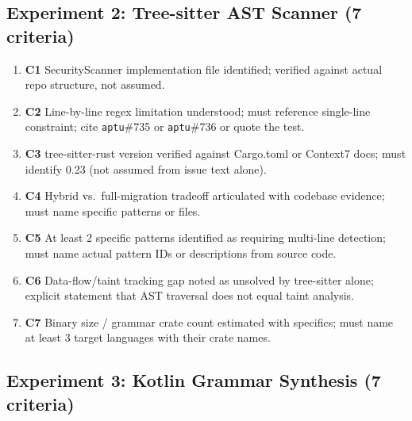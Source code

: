 \documentclass[11pt,a4paper]{article}
\begin{document}
\subsection*{Experiment 2: Tree-sitter AST Scanner (7 criteria)}

\begin{enumerate}
  \item \textbf{C1} SecurityScanner implementation file identified; verified against actual
        repo structure, not assumed.
  \item \textbf{C2} Line-by-line regex limitation understood; must reference single-line
        constraint; cite \texttt{aptu}\#735 or \texttt{aptu}\#736 or quote the test.
  \item \textbf{C3} tree-sitter-rust version verified against Cargo.toml or Context7 docs;
        must identify 0.23 (not assumed from issue text alone).
  \item \textbf{C4} Hybrid vs.\ full-migration tradeoff articulated with codebase evidence;
        must name specific patterns or files.
  \item \textbf{C5} At least 2 specific patterns identified as requiring multi-line detection;
        must name actual pattern IDs or descriptions from source code.
  \item \textbf{C6} Data-flow/taint tracking gap noted as unsolved by tree-sitter alone;
        explicit statement that AST traversal does not equal taint analysis.
  \item \textbf{C7} Binary size / grammar crate count estimated with specifics; must name at
        least 3 target languages with their crate names.
\end{enumerate}

\subsection*{Experiment 3: Kotlin Grammar Synthesis (7 criteria)}
\end{document}
